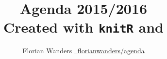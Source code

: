 \documentclass[11pt,a4paper]{book}\usepackage[]{graphicx}\usepackage[]{color}
\def\lsin{\lstinline[basicstyle=\ttfamily,breaklines=true,]} %for inline verbatim (knitr on title)
\begin{document}
\begin{titlepage}

\title{Agenda 2015/2016\\Created with \lsin{knitR} and \XeLaTeX} 
\author{\parbox{\linewidth}{%
  \centering%
  Florian Wanders\endgraf\bigskip
  \href{https://github.com/FlorianWanders/agenda}{\faGithub~florianwanders/agenda}
  }
}
\date{}
\maketitle





\end{titlepage}



\end{document}
